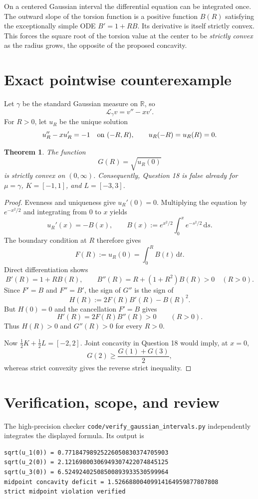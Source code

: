 \documentclass[10pt]{article}
\newtheorem{theorem}{Theorem}
\newcommand{\R}{\mathbb R}
\newcommand{\dd}{\,\mathrm d}
\begin{document}
On a centered Gaussian interval the differential equation can be integrated
once.  The outward slope of the torsion function is a positive function
$B(R)$ satisfying the exceptionally simple ODE $B'=1+RB$.  Its derivative is
itself strictly convex.  This forces the square root of the torsion value at
the center to be \emph{strictly convex} as the radius grows, the opposite of
the proposed concavity.

\section{Exact pointwise counterexample}

Let $\gamma$ be the standard Gaussian measure on $\R$, so
\[
 \mathcal L_\gamma v=v''-xv'.
\]
For $R>0$, let $u_R$ be the unique solution
\[
 u_R''-xu_R'=-1\quad\hbox{on }(-R,R),\qquad u_R(-R)=u_R(R)=0.
\]

\begin{theorem}
The function
\[
 G(R)=\sqrt{u_R(0)}
\]
is strictly convex on $(0,\infty)$.  Consequently, Question 18 is false
already for $\mu=\gamma$, $K=[-1,1]$, and $L=[-3,3]$.
\end{theorem}

\begin{proof}
Evenness and uniqueness give $u_R'(0)=0$.  Multiplying the equation by
$e^{-x^2/2}$ and integrating from $0$ to $x$ yields
\[
 u_R'(x)=-B(x),\qquad
 B(x):=e^{x^2/2}\int_0^x e^{-s^2/2}\dd s .
\]
The boundary condition at $R$ therefore gives
\[
 F(R):=u_R(0)=\int_0^R B(t)\dd t.
\]
Direct differentiation shows
\[
 B'(R)=1+RB(R),\qquad
 B''(R)=R+(1+R^2)B(R)>0\quad(R>0).
\]
Since $F'=B$ and $F''=B'$, the sign of $G''$ is the sign of
\[
 H(R):=2F(R)B'(R)-B(R)^2.
\]
But $H(0)=0$ and the cancellation $F'=B$ gives
\[
 H'(R)=2F(R)B''(R)>0\qquad(R>0).
\]
Thus $H(R)>0$ and $G''(R)>0$ for every $R>0$.

Now $\frac12K+\frac12L=[-2,2]$.  Joint concavity in Question 18 would imply,
at $x=0$,
\[
 G(2)\ge \frac{G(1)+G(3)}2,
\]
whereas strict convexity gives the reverse strict inequality.
\end{proof}

\section{Verification, scope, and review}

The high-precision checker \texttt{code/verify\_gaussian\_intervals.py}
independently integrates the displayed formula.  Its output is
\begin{verbatim}
sqrt(u_1(0)) = 0.77184798925226050830374705903
sqrt(u_2(0)) = 2.12169800306949307422074845125
sqrt(u_3(0)) = 6.52492402508500893933530599964
midpoint concavity deficit = 1.52668800409914164959877807808
strict midpoint violation verified
\end{verbatim}
\end{document}
